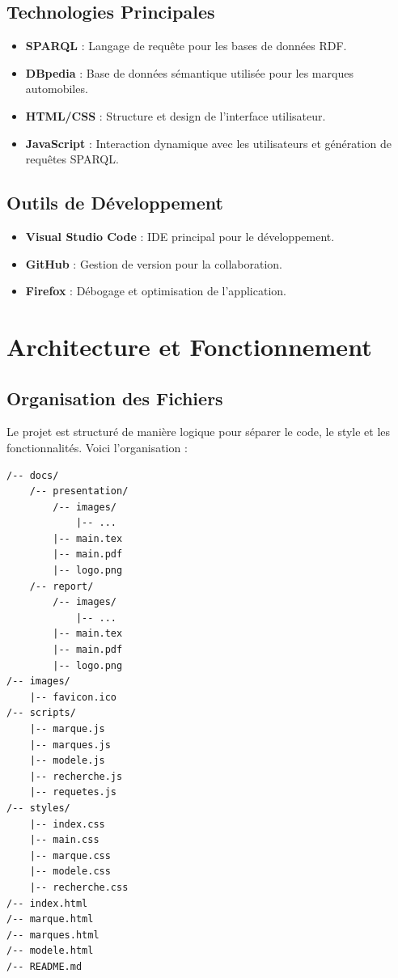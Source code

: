 \documentclass[a4paper]{article}
\begin{document}
\subsection{Technologies Principales}
\begin{itemize}
    \item \textbf{SPARQL} : Langage de requête pour les bases de données RDF.
    \item \textbf{DBpedia} : Base de données sémantique utilisée pour les marques automobiles.
    \item \textbf{HTML/CSS} : Structure et design de l'interface utilisateur.
    \item \textbf{JavaScript} : Interaction dynamique avec les utilisateurs et génération de requêtes SPARQL.
\end{itemize}

\subsection{Outils de Développement}
\begin{itemize}
    \item \textbf{Visual Studio Code} : IDE principal pour le développement.
    \item \textbf{GitHub} : Gestion de version pour la collaboration.
    \item \textbf{Firefox} : Débogage et optimisation de l'application.
\end{itemize}

\newpage

\section{Architecture et Fonctionnement}
\subsection{Organisation des Fichiers}
Le projet est structuré de manière logique pour séparer le code, le style et les fonctionnalités. Voici l'organisation :
\begin{verbatim}
/-- docs/
    /-- presentation/
        /-- images/
            |-- ...
        |-- main.tex
        |-- main.pdf
        |-- logo.png
    /-- report/
        /-- images/
            |-- ...
        |-- main.tex
        |-- main.pdf
        |-- logo.png
/-- images/
    |-- favicon.ico
/-- scripts/
    |-- marque.js
    |-- marques.js
    |-- modele.js
    |-- recherche.js
    |-- requetes.js
/-- styles/
    |-- index.css
    |-- main.css
    |-- marque.css
    |-- modele.css
    |-- recherche.css
/-- index.html
/-- marque.html
/-- marques.html
/-- modele.html
/-- README.md
\end{verbatim}
\end{document}
